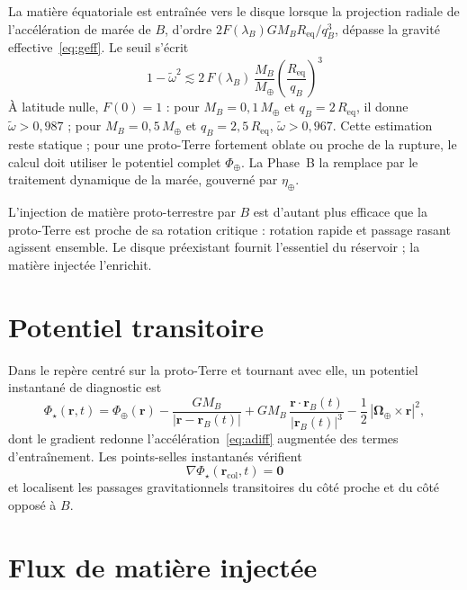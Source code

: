 \documentclass[11pt,a4paper,openany]{report}
\newcommand{\Mt}{M_{\oplus}}
\newcommand{\Req}{R_{\mathrm{eq}}}
\begin{document}
La matière équatoriale est entraînée vers le disque lorsque la projection radiale de
l'accélération de marée de $B$, d'ordre $2F(\lambda_B)GM_B\Req/q_B^3$, dépasse la gravité
effective~\eqref{eq:geff}. Le seuil s'écrit
\begin{equation}
\boxed{\;1-\tilde\omega^2\lesssim2\,F(\lambda_B)\,\frac{M_B}{\Mt}\left(\frac{\Req}{q_B}\right)^{3}\;}
\label{eq:seuil}
\end{equation}
À latitude nulle, $F(0)=1$ : pour $M_B=0{,}1\,\Mt$ et $q_B=2\,\Req$, il donne
$\tilde\omega>0{,}987$ ; pour $M_B=0{,}5\,\Mt$ et $q_B=2{,}5\,\Req$,
$\tilde\omega>0{,}967$. Cette estimation reste statique ; pour une proto-Terre fortement oblate ou
proche de la rupture, le calcul doit utiliser le potentiel complet $\Phi_\oplus$. La Phase~B la
remplace par le traitement dynamique de la marée, gouverné par $\eta_\oplus$.

\begin{lecture}
L'injection de matière proto-terrestre par $B$ est d'autant plus efficace que la proto-Terre est
proche de sa rotation critique : rotation rapide et passage rasant agissent ensemble. Le disque
préexistant fournit l'essentiel du réservoir ; la matière injectée l'enrichit.
\end{lecture}

\section{Potentiel transitoire}

Dans le repère centré sur la proto-Terre et tournant avec elle, un potentiel instantané de
diagnostic est
\begin{equation}
\Phi_\star(\mathbf{r},t)=\Phi_\oplus(\mathbf{r})-\frac{GM_B}{|\mathbf{r}-\mathbf{r}_B(t)|}
+GM_B\,\frac{\mathbf{r}\cdot\mathbf{r}_B(t)}{|\mathbf{r}_B(t)|^3}
-\frac12\,|\boldsymbol{\Omega}_\oplus\times\mathbf{r}|^2,
\label{eq:Phistar}
\end{equation}
dont le gradient redonne l'accélération~\eqref{eq:adiff} augmentée des termes d'entraînement.
Les points-selles instantanés vérifient
\begin{equation}
\nabla\Phi_\star(\mathbf{r}_{\mathrm{col}},t)=\mathbf{0}
\label{eq:col}
\end{equation}
et localisent les passages gravitationnels transitoires du côté proche et du côté opposé à $B$.

\section{Flux de matière injectée}
\end{document}
